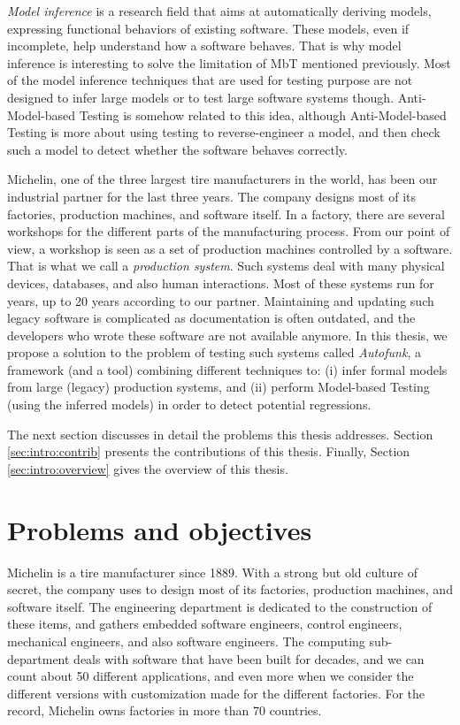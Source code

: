 \emph{Model inference} is a research field that aims at
automatically deriving models, expressing functional behaviors of
existing software. These models, even if incomplete, help
understand how a software behaves. That is why model inference is
interesting to solve the limitation of MbT mentioned previously.
Most of the model inference techniques that are used for testing
purpose are not designed to infer large models or to test large
software systems though. Anti-Model-based Testing \cite{antimbt} is
somehow related to this idea, although Anti-Model-based Testing
is more about using testing to reverse-engineer a model, and then
check such a model to detect whether the software behaves
correctly.

Michelin, one of the three largest tire manufacturers in the
world, has been our industrial partner for the last three years.
The company designs most of its factories, production machines,
and software itself. In a factory, there are several workshops
for the different parts of the manufacturing process. From our
point of view, a workshop is seen as a set of production machines
controlled by a software. That is what we call a \emph{production
system}. Such systems deal with many physical devices, databases,
and also human interactions. Most of these systems run for years,
up to 20 years according to our partner. Maintaining and updating
such legacy software is complicated as documentation is often
outdated, and the developers who wrote these software are not
available anymore.  In this thesis, we propose a solution to the
problem of testing such systems called \textit{Autofunk}, a
framework (and a tool) combining different techniques to: (i)
infer formal models from large (legacy) production systems, and
(ii) perform Model-based Testing (using the inferred models) in
order to detect potential regressions.

The next section discusses in detail the problems this thesis
addresses. Section \ref{sec:intro:contrib} presents the
contributions of this thesis. Finally, Section
\ref{sec:intro:overview} gives the overview of this thesis.


\section{Problems and objectives}
\label{sec:intro:problems}

Michelin is a tire manufacturer since 1889. With a strong but old
culture of secret, the company uses to design most of its
factories, production machines, and software itself. The
engineering department is dedicated to the construction of these
items, and gathers embedded software engineers, control
engineers, mechanical engineers, and also software engineers. The
computing sub-department deals with software that have been built
for decades, and we can count about 50 different applications,
and even more when we consider the different versions with
customization made for the different factories. For the record,
Michelin owns factories in more than 70 countries.

